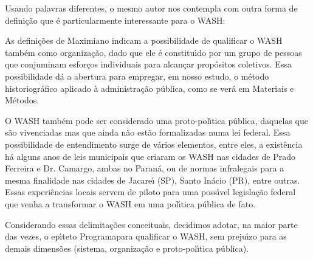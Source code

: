 \documentclass[
12pt,		%
openright,	%
twoside,  %
a4paper,			%
chapter=TITLE,		%
english,			%
french,				%
spanish,			%
brazil				%
]{USPSC-classe/USPSC}
\begin{document}
Usando palavras diferentes, o mesmo autor nos contempla com outra forma de defini\c{c}\~ao que \'e particularmente interessante para o WASH:











\noindent\begin{center}\mbox{\centering{}}\end{center}


As defini\c{c}\~oes de Maximiano indicam a possibilidade de qualificar o WASH tamb\'em como organiza\c{c}\~ao, dado que ele \'e constitu\'{\i}do por um grupo de pessoas que conjuminam esfor\c{c}os individuais para alcan\c{c}ar prop\'ositos coletivos. Essa possibilidade d\'a a abertura para empregar, em nosso estudo, o m\'etodo historiogr\'afico aplicado \`a administra\c{c}\~ao p\'ublica, como se ver\'a em Materiais e M\'etodos.










O WASH tamb\'em pode ser considerado uma proto-pol\'{\i}tica p\'ublica, daquelas que s\~ao vivenciadas mas que ainda n\~ao est\~ao formalizadas numa lei federal. Essa possibilidade de entendimento surge de v\'arios elementos, entre eles, a exist\^encia h\'a alguns anos de leis municipais que criaram os WASH nas cidades de Prado Ferreira e Dr. Camargo, ambas no Paran\'a, ou de normas infralegais para a mesma finalidade nas cidades de Jacare\'{\i} (SP), Santo In\'acio (PR), entre outras. Essas experi\^encias locais servem de piloto para uma poss\'{\i}vel legisla\c{c}\~ao federal que venha a transformar o WASH em uma pol\'{\i}tica p\'ublica de fato.










Considerando essas delimita\c{c}\~oes conceituais, decidimos adotar, na maior parte das vezes, o ep\'{\i}teto \textquotedbl Programa\textquotedbl  para qualificar o WASH, sem preju\'{\i}zo para as demais dimens\~oes (sistema, organiza\c{c}\~ao e proto-pol\'{\i}tica p\'ublica).
\end{document}
